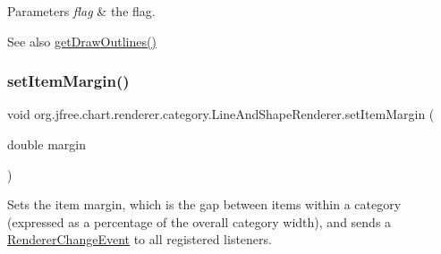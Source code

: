 \begin{DoxyParams}{Parameters}
{\em flag} & the flag.\\
\hline
\end{DoxyParams}
\begin{DoxySeeAlso}{See also}
\mbox{\hyperlink{classorg_1_1jfree_1_1chart_1_1renderer_1_1category_1_1_line_and_shape_renderer_a8df36d56b702ac3e0f4a912c31f02266}{get\+Draw\+Outlines()}} 
\end{DoxySeeAlso}
\mbox{\label{classorg_1_1jfree_1_1chart_1_1renderer_1_1category_1_1_line_and_shape_renderer_ae4b9ba27e8ceaab0ba92c76e04d77d95}} 
\subsubsection{\texorpdfstring{set\+Item\+Margin()}{setItemMargin()}}
{\footnotesize\ttfamily void org.\+jfree.\+chart.\+renderer.\+category.\+Line\+And\+Shape\+Renderer.\+set\+Item\+Margin (\begin{DoxyParamCaption}\item[{double}]{margin }\end{DoxyParamCaption})}

Sets the item margin, which is the gap between items within a category (expressed as a percentage of the overall category width), and sends a \mbox{\hyperlink{}{Renderer\+Change\+Event}} to all registered listeners.


